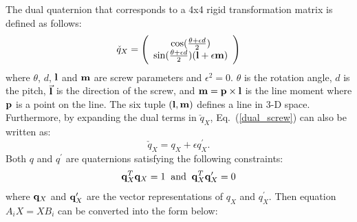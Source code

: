 \documentclass[twocolumn,10pt]{asme2ej}
\begin{document}
The dual quaternion that corresponds to a 4x4 %
rigid transformation matrix is defined as follows:
\begin{equation}
\check{q}_{X} =
\Bigg( 
\begin{array}{c}
\cos(\frac{\theta + \epsilon d}{2})\\
\sin(\frac{\theta + \epsilon d}{2})({\bf l} + \epsilon {\bf m})
\end{array}
\Bigg)
\label{dual_screw}
\end{equation}
where
$\theta$, $d$, ${\bf l}$ and ${\bf m}$ are screw parameters and ${\epsilon}^{2} = 0$. $\theta$ is the rotation angle, $d$ is the pitch, $\vec{\bf l}$ is the direction of the screw, and ${\bf m} = {\bf p} \times {\bf l}$ is the line moment where ${\bf p}$ is a point on the line. The six tuple $({\bf l}, {\bf m})$ defines a line in 3-D space. Furthermore, by expanding the dual terms in $\check{q}_{X}$, Eq.~(\ref{dual_screw}) can also be written as:
\begin{equation}
\check{q}_{X} = q_{X} + \epsilon {q}^{\prime}_{X}.
\end{equation} 
Both $q$ and $q^{\prime}$ are quaternions satisfying the following constraints:
\begin{equation}
{\bf q}^{T}_{X}{\bf q}_{X} = 1 \; \; \text{and} \;
\; {\bf q}^{T}_{X}{\bf q}^{\prime}_{X} = 0
\end{equation}
where ${\bf q}_{X}$ and ${\bf q}^{\prime}_{X}$ are the vector representations of $q_{X}$ and $q^{\prime}_{X}$.
Then equation $A_{i}X = XB_{i}$ can be converted into the form below:
\end{document}
